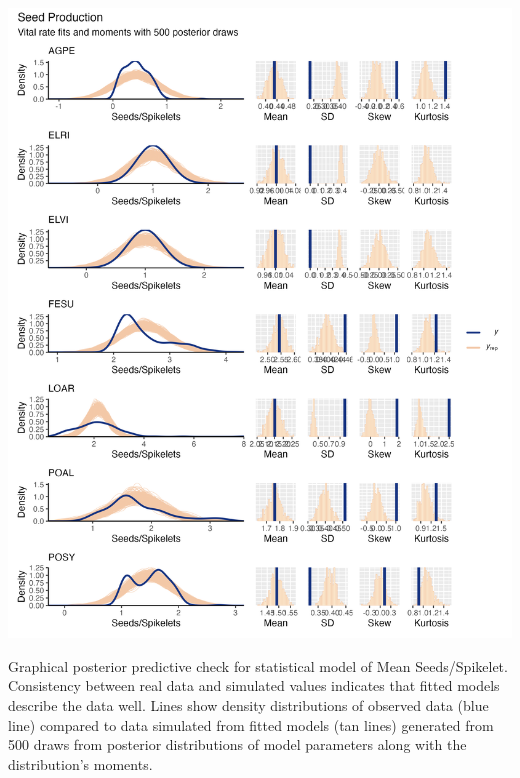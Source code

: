 \documentclass[lineno, sn-basic]{sn-jnl}%
\begin{document}
\begin{myfigure}[H]
	\centering
	\includegraphics[width = \linewidth]{seedmeanbyspecies_densplot.png}
	\caption[Graphical posterior predictive check for statistical model of Mean Seeds/Spikelet]{Graphical posterior predictive check for statistical model of Mean Seeds/Spikelet. Consistency between real data and simulated values indicates that fitted models describe the data well. Lines show density distributions of observed data (blue line) compared to data simulated from fitted models (tan lines) generated from 500 draws from posterior distributions of model parameters along with the distribution's moments.}
\end{myfigure}
\end{document}
